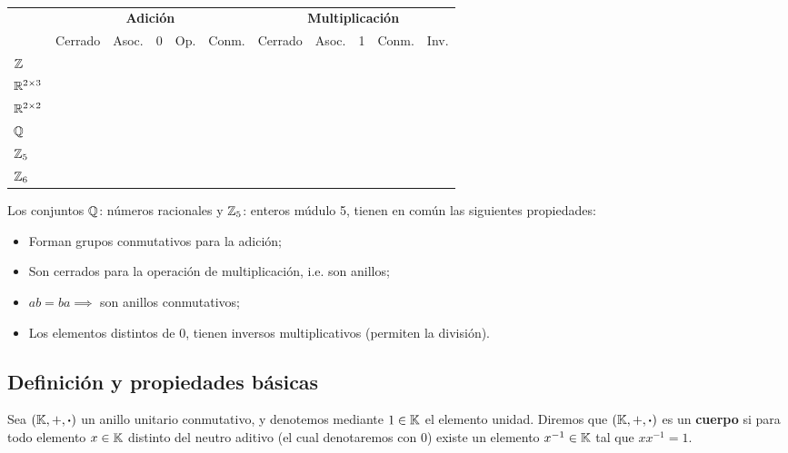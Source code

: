 \begin{table}[H]
	\centering
	\begin{tabular}{|l||c|c|c|c|c||c|c|c|c|c|}
		\hline
		& \multicolumn{5}{c||}{\textbf{Adición}} & \multicolumn{5}{c|}{\textbf{Multiplicación}}\\ \cline{2-11}
		& Cerrado & Asoc. & 0 &  Op. & Conm. & Cerrado & Asoc.& 1 & Conm. & Inv. \\ \hline \hline
		$\mathbb{Z}$ & \cmark & \cmark& \cmark & \cmark & \cmark & \cmark & \cmark& \cmark & \cmark & \xmark\\
		$\mathbb{R}^{2\times 3}$ & \cmark & \cmark & \cmark & \cmark & \cmark & \xmark & \xmark & \xmark & \xmark & \xmark\\
		$\mathbb{R}^{2 \times 2}$ & \cmark & \cmark & \cmark & \cmark & \cmark & \cmark & \cmark & \cmark & \xmark& \xmark\\
		\rowcolor{lightgray!40}%
		$\mathbb{Q}$ & \cmark & \cmark & \cmark& \cmark & \cmark & \cmark & \cmark & \cmark & \cmark& \cmark\\
		\rowcolor{lightgray!40}%
		$\mathbb{Z}_5$ & \cmark & \cmark & \cmark & \cmark & \cmark & \cmark & \cmark & \cmark & \cmark & \cmark\\
		$\mathbb{Z}_6$ & \cmark & \cmark & \cmark & \cmark & \cmark & \cmark & \cmark & \cmark & \cmark & \xmark\\ \hline
	\end{tabular}
	\caption{}
	\label{tab:cuerpo}
\end{table}
Los conjuntos $\mathbb{Q}$: números racionales y $\mathbb{Z}_5$: enteros múdulo 5, tienen en común las siguientes propiedades:
\begin{itemize}
	\item Forman grupos conmutativos para la adición;
	\item Son cerrados para la operación de multiplicación, i.e. son anillos;
	\item $ab = ba \implies$ son anillos conmutativos;
	\item Los elementos distintos de 0, tienen inversos multiplicativos (permiten la división).
\end{itemize}

\subsection{Definición y propiedades básicas}
\vspace{3mm}
\begin{fmd-definition}[Cuerpo] \label{def:cuerpo}
	Sea $(\mathbb{K}, +, \boldsymbol{\cdot})$ un anillo unitario conmutativo, y denotemos mediante $1 \in \mathbb{K}$ el elemento unidad. Diremos que $(\mathbb{K}, +, \boldsymbol{\cdot})$ es un \textbf{cuerpo} si para todo elemento $x \in \mathbb{K}$ distinto del neutro aditivo (el cual denotaremos con 0) existe un elemento $x^{-1} \in \mathbb{K}$ tal que $xx^{-1} = 1$.
\end{fmd-definition}

